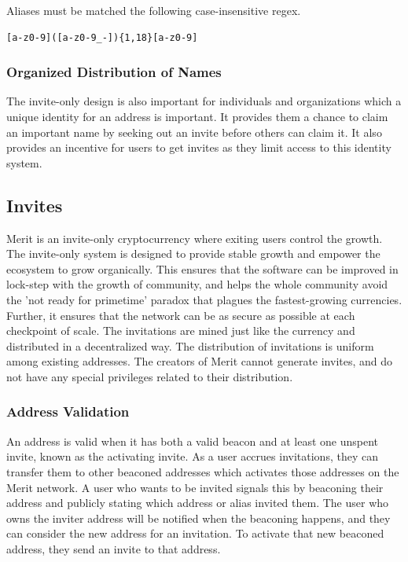 \documentclass{article}
\begin{document}
Aliases must be matched the following case-insensitive \gls{regex}.

\lstset{language=C}
\begin{lstlisting}[caption=Alias Validation Regex]
            [a-z0-9]([a-z0-9_-]){1,18}[a-z0-9]
\end{lstlisting}

\subsubsection{Organized Distribution of Names}

The invite-only design is also important for individuals and organizations
which a unique identity for an address is important.  It provides them a chance to
claim an important name by seeking out an invite before others can claim it. 
It also provides an incentive for users to get invites as they limit access 
to this identity system.

\subsection{Invites}

Merit is an invite-only cryptocurrency where exiting users control the growth.
The invite-only system is designed to provide stable growth and empower the ecosystem 
to grow organically.  This ensures that the software can be improved in lock-step 
with the growth of community, and helps the whole community avoid the 'not ready for primetime'
paradox that plagues the fastest-growing currencies.  Further, it ensures that the network 
can be as secure as possible at each checkpoint of scale.  The invitations are mined just like
the currency and distributed in a decentralized way.  The distribution of
invitations is uniform among existing addresses.  The creators of Merit cannot
generate invites, and do not have any special privileges related to their
distribution.

\subsubsection{Address Validation}

An address is valid when it has both a valid beacon and at least one unspent invite, known as the activating invite.
As a user accrues invitations, they can transfer them to other beaconed addresses
which activates those addresses on the Merit network.  A user who wants to be invited signals
this by beaconing their address and publicly stating which address or alias invited them.  The user who owns the
inviter address will be notified when the beaconing happens, and they can consider
the new address for an invitation.  To activate that new beaconed address, they send
an invite to that address.
\end{document}
